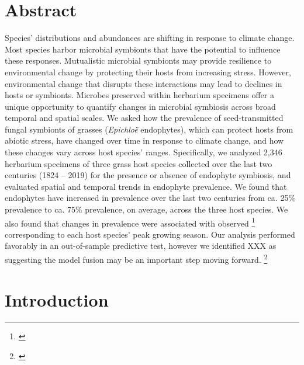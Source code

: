 \documentclass[11pt]{article}
\newcommand{\tom}[2]{{\color{red}{#1}}\footnote{\textit{\color{red}{#2}}}}
\newcommand{\jacob}[2]{{\color{blue}{#1}}\footnote{\textit{\color{blue}{#2}}}}
\begin{document}
	\section*{Abstract}
Species' distributions and abundances are shifting in response to climate change. 
Most species harbor microbial symbionts that have the potential to influence these responses.
Mutualistic microbial symbionts may provide resilience to environmental change by protecting their hosts from increasing stress. 
However, environmental change that disrupts these interactions may lead to declines in hosts or symbionts. 
Microbes preserved within herbarium specimens offer a unique opportunity to quantify changes in microbial symbiosis across broad temporal and spatial scales. 
We asked how the prevalence of seed-transmitted fungal symbionts of grasses (\emph{Epichloë} endophytes), which can protect hosts from abiotic stress, have changed over time in response to climate change, and how these changes vary across host species' ranges.
Specifically, we analyzed 2,346 herbarium specimens of three grass host species collected over the last two centuries (1824 -- 2019) for the presence or absence of endophyte symbiosis, and evaluated spatial and temporal trends in endophyte prevalence. 
We found that endophytes have increased in prevalence over the last two centuries from ca. 25\% prevalence to ca. 75\% prevalence, on average, across the three host species.
We also found that changes in prevalence were associated with observed \tom{changes in seasonal climate drivers}{Describe ``changes'' -- warming? drying?} corresponding to each host species' peak growing season. 
Our analysis performed favorably in an out-of-sample predictive test, however we identified XXX as suggesting the model fusion may be an important step moving forward.
\jacob{Our results provide novel evidence for a cryptic biological response to climate change that may contribute to the resilience of host-microbe symbiosis through context-dependent benefits that confer a fitness advantage to symbiotic hosts under environmental change.}{I like this and the abstract in general. I agree with Tom and I think we  have some space to add these details. Abstract : 300}
	
	\newpage{}
	
	\section*{Introduction}
	
	
\end{document}
